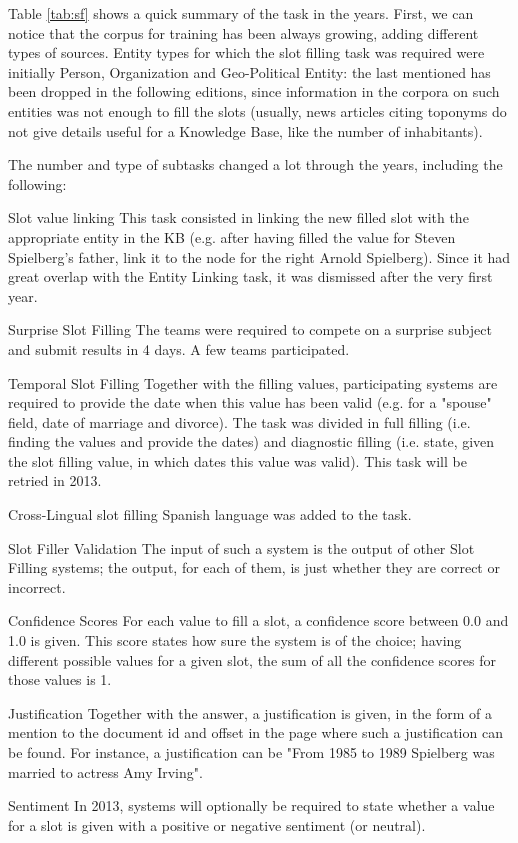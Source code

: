 \documentclass[a4paper,11pt]{report}
\begin{document}
Table \ref{tab:sf} shows a quick summary of the task in the years. First, we can notice that the corpus for training has been always growing, adding different types of sources. Entity types for which the slot filling task was required were initially Person, Organization and Geo-Political Entity: the last mentioned has been dropped in the following editions, since information in the corpora on such entities was not enough to fill the slots (usually, news articles citing toponyms do not give details useful for a Knowledge Base, like the number of inhabitants).

The number and type of subtasks changed a lot through the years, including the following:

\begin{description}
\item{Slot value linking} This task consisted in linking the new filled slot with the appropriate entity in the KB (e.g. after having filled the value for Steven Spielberg's father, link it to the node for the right Arnold Spielberg). Since it had great overlap with the Entity Linking task, it was dismissed after the very first year.
\item{Surprise Slot Filling} The teams were required to compete on a surprise subject and submit results in 4 days. A few teams participated.
\item{Temporal Slot Filling} Together with the filling values, participating systems are required to provide the date when this value has been valid (e.g. for a "spouse" field, date of marriage and divorce). The task was divided in full filling (i.e. finding the values and provide the dates) and diagnostic filling (i.e. state, given the slot filling value, in which dates this value was valid). This task will be retried in 2013.
\item{Cross-Lingual slot filling} Spanish language was added to the task.
\item{Slot Filler Validation} The input of such a system is the output of other Slot Filling systems; the output, for each of them, is just whether they are correct or incorrect.
\item{Confidence Scores} For each value to fill a slot, a confidence score between 0.0 and 1.0 is given. This score states how sure the system is of the choice; having different possible values for a given slot, the sum of all the confidence scores for those values is 1.
\item{Justification} Together with the answer, a justification is given, in the form of a mention to the document id and offset in the page where such a justification can be found. For instance, a justification can be "From 1985 to 1989 Spielberg was married to actress Amy Irving".
\item{Sentiment} In 2013, systems will optionally be required to state whether a value for a slot is given with a positive or negative sentiment (or neutral).
\end{description}
\end{document}

